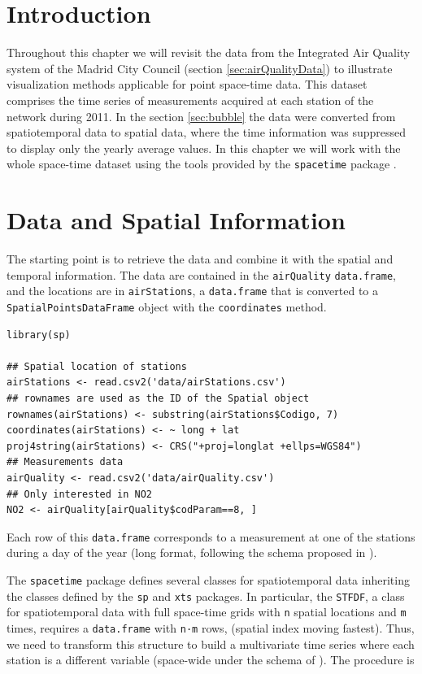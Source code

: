 
\section{Introduction}
\label{sec-1}
Throughout this chapter we will revisit the data from the Integrated
Air Quality system of the Madrid City Council (section
\ref{sec:airQualityData}) to illustrate visualization methods
applicable for point space-time data. This dataset comprises the time
series of measurements acquired at each station of the network
during 2011. In the section \ref{sec:bubble} the data were converted
from spatiotemporal data to spatial data, where the time
information was suppressed to display only the yearly average
values. In this chapter we will work with the whole space-time dataset
using the tools provided by the \texttt{spacetime} package
\cite{Pebesma2012}.
\section{Data and Spatial Information}
\label{sec-2}

The starting point is to retrieve the data and combine it with the
spatial and temporal information. The data are contained in the
\texttt{airQuality} \texttt{data.frame}, and the locations are in \texttt{airStations}, a
\texttt{data.frame} that is converted to a \texttt{SpatialPointsDataFrame} object
with the \texttt{coordinates} method.


\lstset{language=R,numbers=none}
\begin{lstlisting}
library(sp)

## Spatial location of stations
airStations <- read.csv2('data/airStations.csv')
## rownames are used as the ID of the Spatial object
rownames(airStations) <- substring(airStations$Codigo, 7)
coordinates(airStations) <- ~ long + lat
proj4string(airStations) <- CRS("+proj=longlat +ellps=WGS84")
## Measurements data
airQuality <- read.csv2('data/airQuality.csv')
## Only interested in NO2 
NO2 <- airQuality[airQuality$codParam==8, ]
\end{lstlisting}

Each row of this \texttt{data.frame} corresponds to a measurement at one
of the stations during a day of the year (long format, following
the schema proposed in \cite{Pebesma2012}).

The \texttt{spacetime} package defines several classes for spatiotemporal
data inheriting the classes defined by the \texttt{sp} and \texttt{xts} packages.
In particular, the \texttt{STFDF}, a class for spatiotemporal data with full
space-time grids with \texttt{n} spatial locations and \texttt{m} times, requires a
\texttt{data.frame} with \texttt{n·m} rows, (spatial index moving fastest).  Thus,
we need to transform this structure to build a multivariate time
series where each station is a different variable (space-wide under
the schema of \cite{Pebesma2012}). The procedure is


